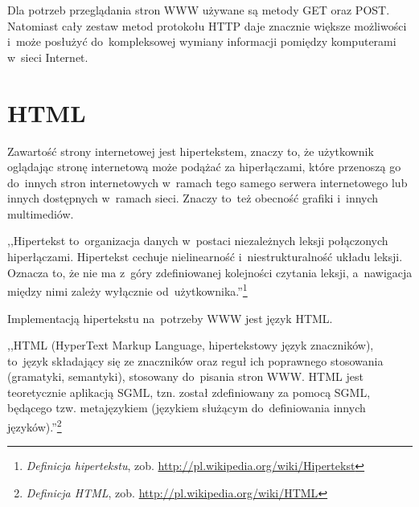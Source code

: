 \documentclass[a4paper,12pt,oneside]{report}
\begin{document}
Dla potrzeb przeglądania stron WWW używane są metody GET oraz POST. Natomiast cały zestaw metod protokołu HTTP daje znacznie większe możliwości i~może posłużyć do~kompleksowej wymiany informacji pomiędzy komputerami w~sieci Internet.

\section{HTML}
\label{sec:html}
Zawartość strony internetowej jest hipertekstem, znaczy to, że użytkownik oglądając stronę internetową może podążać za hiperłączami, które przenoszą go do~innych stron internetowych w~ramach tego samego serwera internetowego lub innych dostępnych w~ramach sieci. Znaczy to~też obecność grafiki i~innych multimediów.

,,Hipertekst to~organizacja danych w~postaci niezależnych leksji połączonych hiperłączami. Hipertekst cechuje nielinearność i~niestrukturalność układu leksji. Oznacza to, że nie ma z~góry zdefiniowanej kolejności czytania leksji, a~nawigacja między nimi zależy wyłącznie od~użytkownika.''\footnote{\emph{Definicja hipertekstu}, zob. \url{http://pl.wikipedia.org/wiki/Hipertekst}}

Implementacją hipertekstu na~potrzeby WWW jest język HTML.

,,HTML (HyperText Markup Language, hipertekstowy język znaczników), to~język składający się ze znaczników oraz reguł ich poprawnego stosowania (gramatyki, semantyki), stosowany do~pisania stron WWW. HTML jest teoretycznie aplikacją SGML, tzn. został zdefiniowany za pomocą SGML, będącego tzw. metajęzykiem (językiem służącym do~definiowania innych języków).''\footnote{\emph{Definicja HTML}, zob. \url{http://pl.wikipedia.org/wiki/HTML}}
\end{document}
